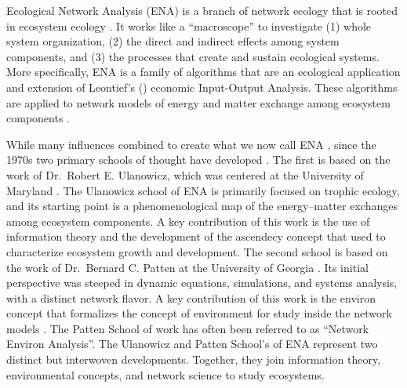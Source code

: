 \documentclass[11pt]{article}
\begin{document}
\begin{spacing}{2}
Ecological Network Analysis (ENA) is a branch of network ecology that
is rooted in ecosystem ecology \citep{borrett12_netecol}.  It works
like a ``macroscope'' to investigate (1) whole system organization,
(2) the direct and indirect effects among system components, and (3)
the processes that create and sustain ecological systems.  More
specifically, ENA is a family of algorithms that are an ecological
application and extension of Leontief's (\citeyear{leontief66})
economic Input-Output Analysis.  These algorithms are applied to
network models of energy and matter exchange among ecosystem
components \citep{patten76, ulanowicz86, fath99_review, hannon73}.


While many influences combined to create what we now call ENA
\citep[e.g.,][]{patten59, margalef63, hannon73, pimm82,
  golley1993history}, since the 1970s two primary schools of thought
have developed \citep{scharler09comparing}.  The
first is based on the work of Dr.\ Robert E. Ulanowicz, which was
centered at the University of Maryland \citep{ulanowicz86,
  ulanowicz97, ulanowicz09_window}.  The Ulanowicz school of ENA is
primarily focused on trophic ecology, and its starting point is a
phenomenological map of the energy--matter exchanges among ecosystem
components.  A key contribution of this work is the use of information
theory and the development of the ascendecy concept that
\citet{ulanowicz86, ulanowicz97} used to characterize ecosystem growth
and development.  The second school is based on the work of Dr.\
Bernard C. Patten at the University of Georgia \citep{patten76,
  matis81, patten82, fath99_review}.  Its initial perspective was
steeped in dynamic equations, simulations, and systems analysis, with
a distinct network flavor.  A key contribution of this work is the
environ concept that formalizes the concept of environment for study
inside the network models \citep{patten78}.  The Patten School of work
has often been referred to as ``Network Environ Analysis''.  The
Ulanowicz and Patten School's of ENA represent two distinct but
interwoven developments.  Together, they join information theory,
environmental concepts, and network science to study ecosystems.


\end{spacing}
\end{document}

